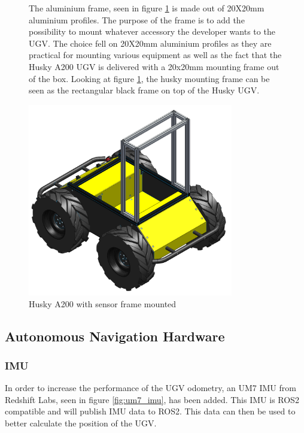\begin{figure}[H]
  \centering
  \begin{minipage}[b]{0.49\textwidth}
        \centering
         The aluminium frame, seen in figure \ref{fig:user_frame} is made out of 20X20mm aluminium profiles. The purpose of the frame is to add the possibility to mount whatever accessory the developer wants to the UGV. The choice fell on 20X20mm aluminium profiles as they are practical for mounting various equipment as well as the fact that the Husky A200 UGV is delivered with a 20x20mm mounting frame out of the box. Looking at figure \ref{fig:user_frame}, the husky mounting frame can be seen as the rectangular black frame on top of the Husky UGV.
  \end{minipage}
  \hfill
  \begin{minipage}[b]{0.49\textwidth}
   \centering
    \includegraphics[width = 0.8\textwidth]{Figures/husky_with_frame.png}
    \caption{Husky A200 with sensor frame mounted}
    \label{fig:user_frame}
  \end{minipage}
\end{figure}

\subsection{Autonomous Navigation Hardware}

\subsubsection{IMU}
In order to increase the performance of the UGV odometry, an UM7 IMU from Redshift Labs, seen in figure \ref{fig:um7_imu}, has been added. This IMU is ROS2 compatible and will publish IMU data to ROS2. This data can then be used to better calculate the position of the UGV. 

